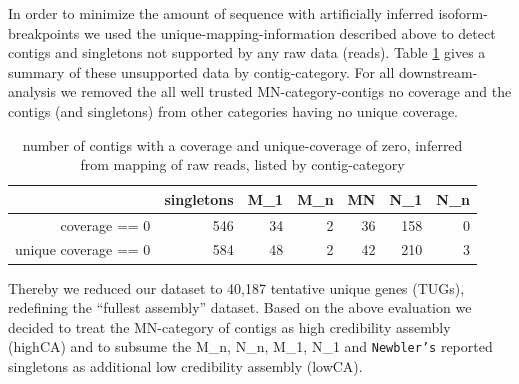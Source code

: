 \documentclass[12pt,a4paper]{article}
\begin{document}
In order to minimize the amount of sequence with artificially inferred
isoform-breakpoints we used the unique-mapping-information described
above to detect contigs and singletons not supported by any raw data
(reads). Table \ref{tab:cov.ex} gives a summary of these unsupported
data by contig-category. For all downstream-analysis we removed the
all well trusted MN-category-contigs no coverage and the contigs (and
singletons) from other categories having no unique coverage.

\begin{table}[ht]
\begin{center}
\begin{tabular}{rrrrrrr}
  \hline
 & singletons & M\_1 & M\_n & MN & N\_1 & N\_n \\ 
  \hline
coverage == 0 & 546 &  34 &   2 &  36 & 158 &   0 \\ 
  unique coverage == 0 & 584 &  48 &   2 &  42 & 210 &   3 \\ 
   \hline
\end{tabular}
\caption{number of contigs with a coverage and unique-coverage of zero, inferred from mapping of raw reads, listed by contig-category}
\label{tab:cov.ex}
\end{center}
\end{table}
Thereby we reduced our dataset to 40,187 tentative unique genes
(TUGs), redefining the ``fullest assembly'' dataset. Based on the
above evaluation we decided to treat the MN-category of contigs as
high credibility assembly (highCA) and to subsume the M\_n, N\_n,
M\_1, N\_1 and \texttt{Newbler's} reported singletons as additional
low credibility assembly (lowCA).




\newpage
\end{document}
